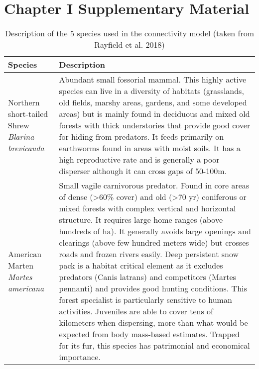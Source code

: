 
\chapter*{\textbf{Chapter I Supplementary Material \\ \hspace{1em}}}

\setcounter{chapter}{3}
\setcounter{table}{0}
\begin{longtable}[c]{|p{5cm}|p{11cm}|}
\caption{Description of the 5 species used in the connectivity model (taken from Rayfield et al. 2018)}
\label{tab:species} \\
\hline
\hline
\textbf{Species} & \textbf{Description} \\ \hline
Northern short-tailed Shrew \newline \textit{Blarina brevicauda} & Abundant small fossorial mammal. This highly active species can live in a diversity of habitats (grasslands, old fields, marshy areas, gardens, and some developed areas) but is mainly found in deciduous and mixed old forests with thick understories that provide good cover for hiding from predators. It feeds primarily on earthworms found in areas with moist soils. It has a high reproductive rate and is generally a poor disperser although it can cross gaps of 50-100m. \\ \hline
American Marten \newline \textit{Martes americana} & Small vagile carnivorous predator. Found in core areas of dense (\textgreater{}60\% cover) and old (\textgreater{}70 yr) coniferous or mixed forests with complex vertical and horizontal structure. It requires large home ranges (above hundreds of ha). It generally avoids large openings and clearings (above few hundred meters wide) but crosses roads and frozen rivers easily. Deep persistent snow pack is a habitat critical element as it excludes predators (Canis latrans) and competitors (Martes pennanti) and provides good hunting conditions. This forest specialist is particularly sensitive to human activities. Juveniles are able to cover tens of kilometers when dispersing, more than what would be expected from body mass-based estimates. Trapped for its fur, this species has patrimonial and economical importance. \\ \hline

\end{longtable}
